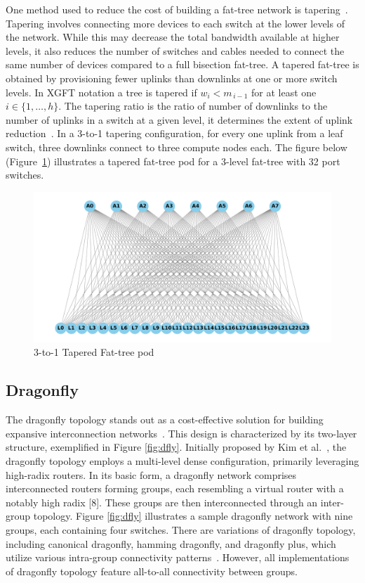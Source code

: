 One method used to reduce the cost of building a fat-tree network is
tapering~\cite{Jain:sc2017}. Tapering involves connecting more devices to each switch at the lower
levels of the network. While this may decrease the total
bandwidth available at higher levels, it also reduces the number of switches and
cables needed to connect the same number of devices compared to a full bisection fat-tree.
A tapered fat-tree is obtained by provisioning fewer uplinks than downlinks at one or more switch levels. In XGFT notation a tree is tapered if
\(
  w_{i}<m_{\,i-1}
\)
for at least one \(i\in\{1,\dots ,h\}\).
The tapering ratio is the ratio of number of downlinks to the number of uplinks in a switch at a given level, it determines the extent of uplink reduction~\cite{Jain:sc2017, taffet2019testing}. In a 3-to-1 tapering configuration, for every one uplink from a leaf switch, three downlinks connect to three compute nodes each.
The figure below (Figure~\ref{fig:tapered_ft}) illustrates a tapered fat-tree pod for a 3-level fat-tree with 32 port switches.
\begin{figure}[h]
  \centering
  \includegraphics[width=\columnwidth]{./figs_4/tapered_fat_tree_pod.pdf}
  \caption{3-to-1 Tapered Fat-tree pod}
  \label{fig:tapered_ft}
\end{figure}


\subsection{Dragonfly} The dragonfly topology stands out as a cost-effective
solution for building expansive interconnection networks~\cite{kim2008technology}. This design is
characterized by its two-layer structure, exemplified in Figure \ref{fig:dfly}. Initially
proposed by Kim et al.~\cite{kim2008technology}, the dragonfly topology employs a multi-level dense
configuration, primarily leveraging high-radix routers.  In its basic form, a
dragonfly network comprises interconnected routers forming groups, each
resembling a virtual router with a notably high radix [8]. These groups are then
interconnected through an inter-group topology. 
Figure \ref{fig:dfly} illustrates a sample dragonfly network with nine groups, each containing four switches.
There are variations of
dragonfly topology, including canonical dragonfly, hamming dragonfly, and
dragonfly plus, which utilize various intra-group connectivity patterns~\cite{hastings2015comparing}.
However, all implementations of dragonfly topology feature all-to-all
connectivity between groups. 

